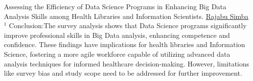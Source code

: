\begin{abstract_online}{Assessing the Efficiency of Data Science Programs in Enhancing Big Data Analysis Skills among Health Libraries and Information Scientists.}{%
        \underline{ Rajabu Simba}$^{1}$}
	Conclusion:The survey analysis shows that Data Science programs significantly improve professional skills in Big Data analysis, enhancing competence and confidence. These findings have implications for health libraries and Information Science, fostering a more agile workforce capable of utilizing advanced data analysis techniques for informed healthcare decision-making. However, limitations like survey bias and study scope need to be addressed for further improvement.  
    \end{abstract_online}
    
